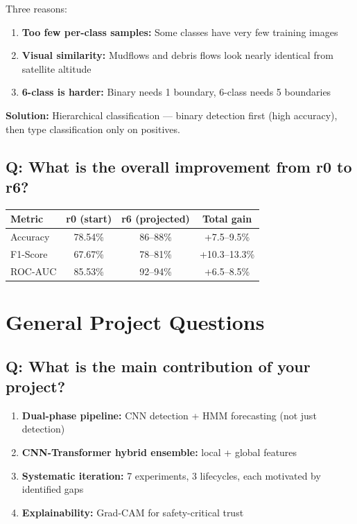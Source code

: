 \documentclass[11pt]{article}
\begin{document}
Three reasons:
\begin{enumerate}[noitemsep]
    \item \textbf{Too few per-class samples:} Some classes have very few training images
    \item \textbf{Visual similarity:} Mudflows and debris flows look nearly identical from satellite altitude
    \item \textbf{6-class is harder:} Binary needs 1 boundary, 6-class needs 5 boundaries
\end{enumerate}

\textbf{Solution:} Hierarchical classification --- binary detection first (high accuracy), then type classification only on positives.

\subsection{Q: What is the overall improvement from r0 to r6?}

\begin{table}[H]
    \centering
    \renewcommand{\arraystretch}{1.2}
    \begin{tabular}{lccc}
        \toprule
        \textbf{Metric} & \textbf{r0 (start)} & \textbf{r6 (projected)} & \textbf{Total gain} \\
        \midrule
        Accuracy & 78.54\% & 86--88\% & +7.5--9.5\% \\
        F1-Score & 67.67\% & 78--81\% & +10.3--13.3\% \\
        ROC-AUC & 85.53\% & 92--94\% & +6.5--8.5\% \\
        \bottomrule
    \end{tabular}
\end{table}

\section{General Project Questions}

\subsection{Q: What is the main contribution of your project?}

\begin{enumerate}[noitemsep]
    \item \textbf{Dual-phase pipeline:} CNN detection + HMM forecasting (not just detection)
    \item \textbf{CNN-Transformer hybrid ensemble:} local + global features
    \item \textbf{Systematic iteration:} 7 experiments, 3 lifecycles, each motivated by identified gaps
    \item \textbf{Explainability:} Grad-CAM for safety-critical trust
\end{enumerate}
\end{document}
